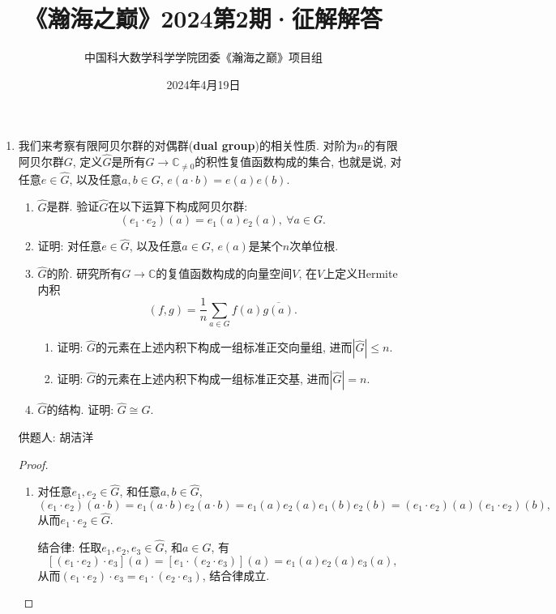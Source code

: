 \documentclass[lang=cn,12pt,a4paper]{elegantpaper.cls}
\title{《瀚海之巅》2024第2期·征解解答}
\author{中国科大数学科学学院团委\quad《瀚海之巅》项目组}
\date{2024年4月19日}
\begin{document}
\maketitle
\begin{enumerate}

\item 我们来考察有限阿贝尔群的对偶群(\textbf{dual group})的相关性质. 对阶为$n$的有限阿贝尔群$G$, 定义$\hat{G}$是所有$G \to \mathbb C_{\neq 0}$的积性复值函数构成的集合, 也就是说, 对任意$e\in \hat{G}$, 以及任意$a,b\in G$, $e(a\cdot b)=e(a)e(b)$.
\begin{enumerate}

\item $\hat G$是群. 验证$\hat{G}$在以下运算下构成阿贝尔群: \[(e_1\cdot e_2)(a)=e_1(a)e_2(a),\ \forall a\in G.\]

\item 证明: 对任意$e\in \hat{G}$, 以及任意$a\in G$, $e(a)$是某个$n$次单位根.

\item $\hat{G}$的阶. 研究所有$G\to \mathbb{C}$的复值函数构成的向量空间$V$, 在$V$上定义Hermite内积\[(f,g)=\frac{1}{n}\sum_{a\in G}f(a)\overline{g(a)}.\]

\begin{enumerate}[label=(\roman*)]

\item 证明: $\hat{G}$的元素在上述内积下构成一组标准正交向量组, 进而$|\hat{G}|\leq n$.

\item 证明: $\hat{G}$的元素在上述内积下构成一组标准正交基, 进而$|\hat{G}|=n$.
\end{enumerate}

\item $\hat{G}$的结构. 证明: $\hat{G}\cong G$.
\end{enumerate}
\begin{flushright}
	\kaishu
	供题人: 胡洁洋
\end{flushright}
	
	\begin{proof}
		\begin{enumerate}
		\item 对任意$e_1,e_2\in \hat{G}$, 和任意$a,b\in \hat{G}$, \[(e_1\cdot e_2)(a\cdot b)=e_1(a\cdot b)e_2(a\cdot b)=e_1(a)e_2(a)e_1(b)e_2(b)=(e_1\cdot e_2)(a)(e_1\cdot e_2)(b),\]从而$e_1\cdot e_2\in \hat{G}$.
		
		结合律: 任取$e_1,e_2,e_3\in \hat{G}$, 和$a\in G$, 有\[[(e_1\cdot e_2)\cdot e_3](a)=[e_1\cdot (e_2\cdot e_3)](a)=e_1(a)e_2(a)e_3(a),\]从而$(e_1\cdot e_2)\cdot e_3=e_1\cdot (e_2\cdot e_3)$, 结合律成立.
		

\end{enumerate}
\end{proof}
\end{enumerate}
\end{document}

